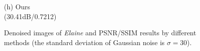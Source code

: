 \documentclass[runningheads]{llncs}
\begin{document}
\begin{figure}
{\begin{minipage}[t]{0.244\textwidth}
{\footnotesize (h) Ours \\(30.41dB/0.7212)}
\end{minipage}
}
\caption{Denoised images of \textsl{Elaine} and PSNR/SSIM results by different methods (the standard deviation of Gaussian noise is $\sigma=30$).}
\label{fig2}
\end{figure}

\begin{figure}
\centering
{}
\end{figure}
\end{document}
